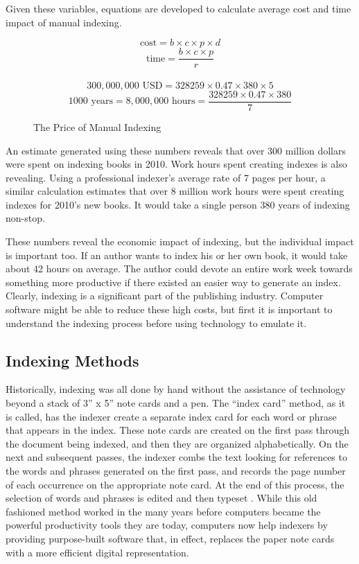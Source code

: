 Given these variables, equations are developed to calculate average cost and time impact of manual indexing.

\begin{figure}[H]
$$ \text{cost} = b \times c \times p \times d $$
$$ \text{time} = \frac{b \times c \times p}{r} $$
\\
$$ 300,000,000 \text{ USD} = 328259 \times 0.47 \times 380 \times 5 $$
$$ 1000 \text{ years} = 8,000,000 \text{ hours} = \frac{328259 \times 0.47 \times 380}{7}$$
\caption{The Price of Manual Indexing}
\end{figure}

An estimate generated using these numbers reveals that over 300 million dollars were spent on indexing books in 2010. Work hours spent creating indexes is also revealing.
Using a professional indexer's average rate of 7 pages per hour, a similar calculation estimates that over 8 million work hours were spent creating indexes for 2010's new books. It would take a single person 380 years of indexing non-stop.

These numbers reveal the economic impact of indexing, but the individual impact is important too.
If an author wants to index his or her own book, it would take about 42 hours on average. The author could devote an entire work week towards something more productive if there existed an easier way to generate an index.
Clearly, indexing is a significant part of the publishing industry.
Computer software might be able to reduce these high costs, but first it is important to understand the indexing process before using technology to emulate it.

\subsection{Indexing Methods}
\label{sec:indexing-methods}

Historically, indexing was all done by hand without the assistance of technology beyond a stack of 3'' x 5'' note cards and a pen.
The ``index card'' method, as it is called, has the indexer create a separate index card for each word or phrase that appears in the index.
These note cards are created on the first pass through the document being indexed, and then they are organized alphabetically.
On the next and subsequent passes, the indexer combs the text looking for references to the words and phrases generated on the first pass, and records the page number of each occurrence on the appropriate note card.
At the end of this process, the selection of words and phrases is edited and then typeset \cite{mulvany}.
While this old fashioned method worked in the many years before computers became the powerful productivity tools they are today, computers now help indexers by providing purpose-built software that, in effect, replaces the paper note cards with a more efficient digital representation.

